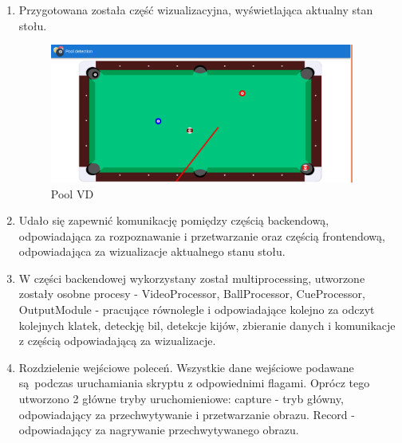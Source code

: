 \documentclass[12pt]{article}
\begin{document}
\begin{enumerate}
\item Przygotowana została część wizualizacyjna, wyświetlająca aktualny stan stołu.

\begin{figure}[H]
    \centering
    \includegraphics[width=10cm]{./diagrams/out/poolvd.png}
    \caption{Pool VD}
    \label{}
\end{figure}

\item Udało się zapewnić komunikację pomiędzy częścią backendową, odpowiadająca za rozpoznawanie i przetwarzanie oraz częścią frontendową, odpowiadająca za wizualizacje aktualnego stanu stołu.

\item W części backendowej wykorzystany został multiprocessing, utworzone zostały osobne procesy - VideoProcessor, BallProcessor, CueProcessor, OutputModule - pracujące równolegle i odpowiadające kolejno za odczyt kolejnych klatek, deteckję bil, 
detekcje kijów, zbieranie danych i komunikacje z częścią odpowiadającą za wizualizacje.

\item Rozdzielenie wejściowe poleceń. Wszystkie dane wejściowe podawane są podczas uruchamiania skryptu z odpowiednimi flagami. Oprócz tego utworzono 2 główne tryby uruchomieniowe: capture - tryb główny, odpowiadający za przechwytywanie i
przetwarzanie obrazu. Record - odpowiadający za nagrywanie przechwytywanego obrazu. 

\end{enumerate}


\vspace{2cm}
\end{document}
